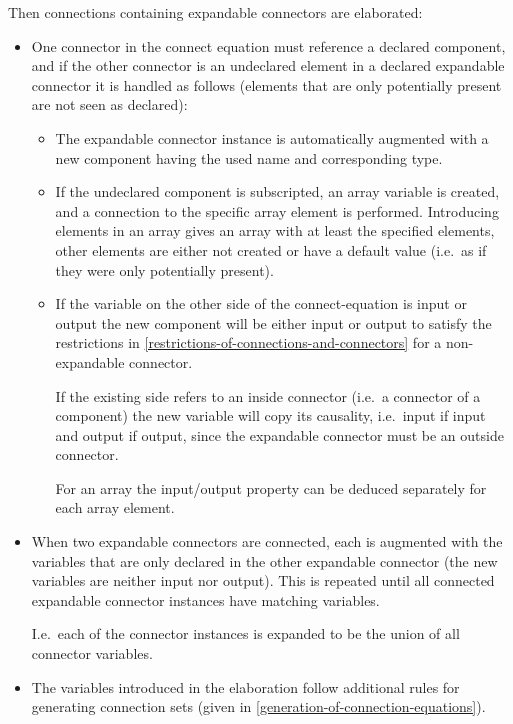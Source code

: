 Then connections containing expandable connectors are elaborated:
\begin{itemize}
\item
  One connector in the connect equation must reference a declared
  component, and if the other connector is an undeclared element in a
  declared expandable connector it is handled as follows (elements that
  are only potentially present are not seen as declared):
  \begin{itemize}
  \item
    The expandable connector instance is automatically augmented with a
    new component having the used name and corresponding type.
  \item
    If the undeclared component is subscripted, an array variable is created, and a connection to the specific array element is performed.  Introducing elements in an
    array gives an array with at least the specified elements, other elements are either not created or have a default value (i.e.\ as if they were only potentially present).
  \item
    If the variable on the other side of the connect-equation is input or output the new component will be either input or output to satisfy the restrictions in
    \autoref{restrictions-of-connections-and-connectors} for a non-expandable connector.
    \begin{nonnormative}
    If the existing side refers to an inside connector (i.e.\ a connector of a component) the new variable will copy its causality, i.e.\ input
    if input and output if output, since the expandable connector must be an outside connector.
    \end{nonnormative}
    For an array the input/output property can be deduced separately for each array element.
  \end{itemize}

\item
  When two expandable connectors are connected, each is augmented with
  the variables that are only declared in the other expandable connector
  (the new variables are neither input nor output). This is repeated
  until all connected expandable connector instances have matching
  variables.
  \begin{nonnormative}
  I.e.\ each of the connector instances is expanded to be the union of all connector variables.
  \end{nonnormative}

\item
  The variables introduced in the elaboration follow additional rules
  for generating connection sets (given in \autoref{generation-of-connection-equations}).


\end{itemize}
